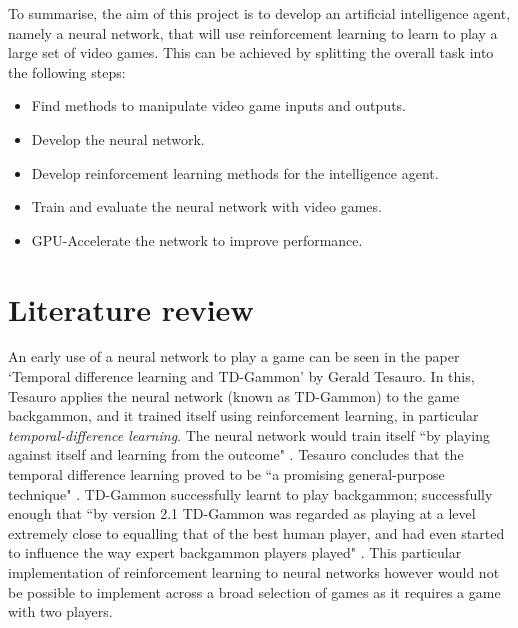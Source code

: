 \documentclass[10pt]{article}
\begin{document}
	To summarise, the aim of this project is to develop an artificial intelligence agent, namely a neural network, that will use reinforcement learning to learn to play a large set of video games. This can be achieved by splitting the overall task into the following steps:
	
	\begin{itemize}
		\item Find methods to manipulate video game inputs and outputs.
		\item Develop the neural network.
		\item Develop reinforcement learning methods for the intelligence agent.
		\item Train and evaluate the neural network with video games.
		\item GPU-Accelerate the network to improve performance.
	\end{itemize}
	
	\bigskip

\section{Literature review}
	
		
		An early use of a neural network to play a game can be seen in the paper `Temporal difference learning and TD-Gammon' by Gerald Tesauro. In this, Tesauro applies the neural network (known as TD-Gammon) to the game backgammon, and it trained itself using reinforcement learning, in particular \textit{temporal-difference learning}. The neural network would train itself ``by playing against itself and learning from the outcome" \cite{tdgammon}. Tesauro concludes that the temporal difference learning proved to be ``a promising general-purpose technique" \cite{tdgammon}. TD-Gammon successfully learnt to play backgammon; successfully enough that ``by version 2.1 TD-Gammon was regarded as playing at a level extremely close to equalling that of the best human player, and had even started to influence the way expert backgammon players played" \cite{tdgammon}. This particular implementation of reinforcement learning to neural networks however would not be possible to implement across a broad selection of games as it requires a game with two players.\\
		
\end{document}
